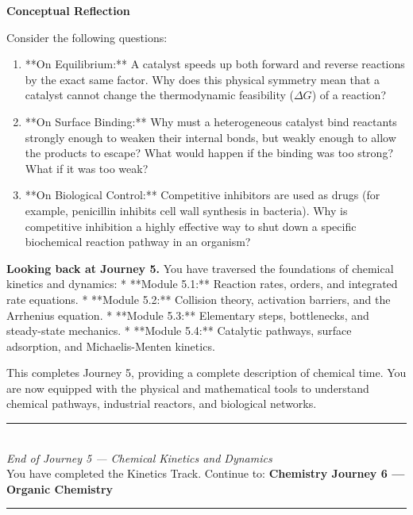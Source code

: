 \documentclass[12pt, a4paper]{book}
\begin{document}
\begin{reflectionbox}
\textbf{Conceptual Reflection}

Consider the following questions:
\begin{enumerate}
  \item **On Equilibrium:** A catalyst speeds up both forward and reverse reactions by the exact same factor. Why does this physical symmetry mean that a catalyst cannot change the thermodynamic feasibility ($\Delta G$) of a reaction?
  \item **On Surface Binding:** Why must a heterogeneous catalyst bind reactants strongly enough to weaken their internal bonds, but weakly enough to allow the products to escape? What would happen if the binding was too strong? What if it was too weak?
  \item **On Biological Control:** Competitive inhibitors are used as drugs (for example, penicillin inhibits cell wall synthesis in bacteria). Why is competitive inhibition a highly effective way to shut down a specific biochemical reaction pathway in an organism?
\end{enumerate}
\end{reflectionbox}

\medskip
\noindent\textbf{Looking back at Journey 5.}
You have traversed the foundations of chemical kinetics and dynamics:
* **Module 5.1:** Reaction rates, orders, and integrated rate equations.
* **Module 5.2:** Collision theory, activation barriers, and the Arrhenius equation.
* **Module 5.3:** Elementary steps, bottlenecks, and steady-state mechanics.
* **Module 5.4:** Catalytic pathways, surface adsorption, and Michaelis-Menten kinetics.

This completes Journey 5, providing a complete description of chemical time. You are now equipped with the physical and mathematical tools to understand chemical pathways, industrial reactors, and biological networks.

\vspace{1.4cm}
\begin{center}
{\color{JourneyColor}\rule{0.5\linewidth}{0.8pt}}\\[6pt]
{\small\color{JourneyColor}\textit{End of Journey 5 --- Chemical Kinetics and Dynamics}}\\[4pt]
{\small\color{JourneyColor}You have completed the Kinetics Track. Continue to: \textbf{Chemistry Journey 6 --- Organic Chemistry}}\\[6pt]
{\color{JourneyColor}\rule{0.5\linewidth}{0.8pt}}
\end{center}
\end{document}

